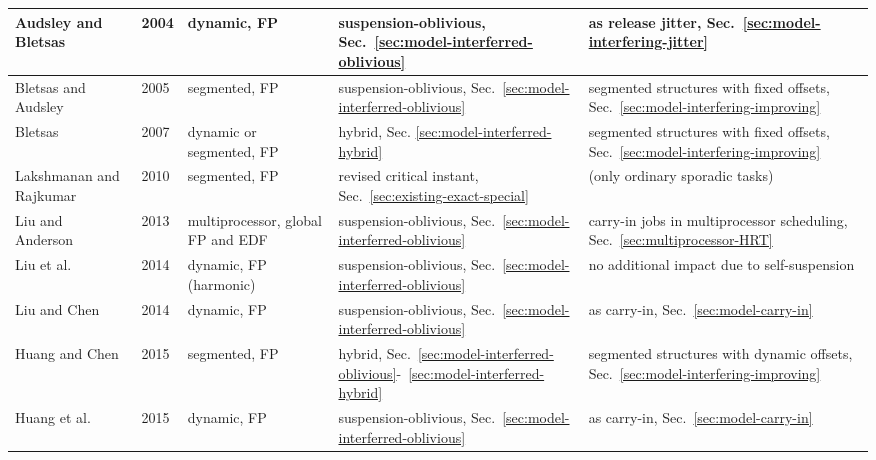 \begin{table}[h]
{\begin{tabular}{||C{2.5cm}|C{1cm}|C{3cm}||C{5cm}|C{10cm}|}
\hline
Audsley and Bletsas~\cite{ECRTS-AudsleyB04,RTAS-AudsleyB04} & 2004 & dynamic, FP& suspension-oblivious, Sec.~\ref{sec:model-interferred-oblivious}& as release jitter, Sec.~\ref{sec:model-interfering-jitter}  \\%
\hline 
Bletsas and Audsley~\cite{RTCSA-BletsasA05} & 2005 & segmented, FP& suspension-oblivious, Sec.~\ref{sec:model-interferred-oblivious}& segmented structures with fixed offsets, Sec.~\ref{sec:model-interfering-improving}\\%
\hline
Bletsas~\cite[Chapter 5.4]{bletsas:thesis} & 2007 & dynamic or segmented, FP& hybrid, Sec. \ref{sec:model-interferred-hybrid}&segmented structures with fixed offsets, Sec.~\ref{sec:model-interfering-improving} \\%
\hline 
Lakshmanan and Rajkumar~\cite{LR:rtas10} & 2010 & segmented, FP&
revised critical instant, Sec.~\ref{sec:existing-exact-special} &
(only ordinary sporadic tasks) \\%
\hline
Liu and Anderson~\cite{DBLP:conf/ecrts/LiuA13} & 2013 & multiprocessor, global FP and EDF &  suspension-oblivious, Sec.~\ref{sec:model-interferred-oblivious}& carry-in jobs in multiprocessor scheduling, Sec.~\ref{sec:multiprocessor-HRT} \\%
\hline 
Liu et al. \cite{DBLP:conf/ecrts/LiuCH014} & 2014 & dynamic, FP (harmonic)& suspension-oblivious, Sec.~\ref{sec:model-interferred-oblivious}& no additional impact due to self-suspension\\%
\hline 
Liu and Chen~\cite{LiuChen:rtss2014} & 2014 & dynamic, FP& suspension-oblivious, Sec.~\ref{sec:model-interferred-oblivious}& as carry-in, Sec.~\ref{sec:model-carry-in}\\%
\hline
Huang and Chen \cite{Huang:multiseg}& 2015 & segmented, FP& hybrid, Sec.~\ref{sec:model-interferred-oblivious}-~\ref{sec:model-interferred-hybrid} & segmented structures with dynamic offsets, Sec.~\ref{sec:model-interfering-improving}\\%
\hline
Huang et al.~\cite{huangpass:dac2015} & 2015 & dynamic, FP& suspension-oblivious, Sec.~\ref{sec:model-interferred-oblivious}& as carry-in,  Sec.~\ref{sec:model-carry-in}\\%

\end{tabular}}
\end{table}
